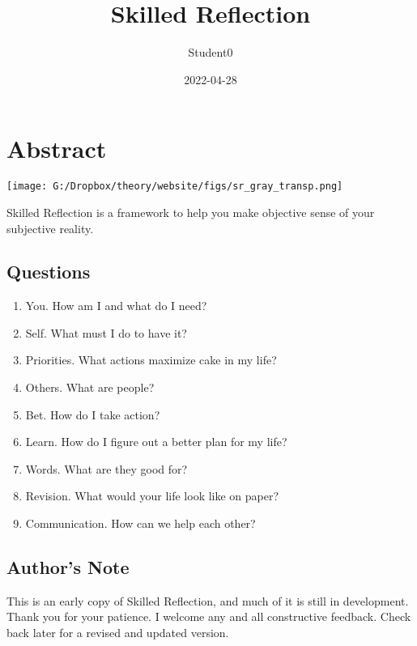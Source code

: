 \documentclass[
]{book}
\title{Skilled Reflection}
\author{Student0}
\date{2022-04-28}
\providecommand{\tightlist}{%
  \setlength{\itemsep}{0pt}\setlength{\parskip}{0pt}}
\begin{document}
\maketitle

{
\setcounter{tocdepth}{1}
\tableofcontents
}
\hypertarget{abstract}{%
\chapter*{Abstract}\label{abstract}}

\texttt{[image: G:/Dropbox/theory/website/figs/sr\_gray\_transp.png]}

Skilled Reflection is a framework to help you make objective sense of your subjective reality.

\hypertarget{questions}{%
\section{Questions}\label{questions}}

\begin{enumerate}
\def\labelenumi{\arabic{enumi}.}
\tightlist
\item
  You. How am I and what do I need?
\item
  Self. What must I do to have it?
\item
  Priorities. What actions maximize cake in my life?\\
\item
  Others. What are people?\\
\item
  Bet. How do I take action?\\
\item
  Learn. How do I figure out a better plan for my life?\\
\item
  Words. What are they good for?\\
\item
  Revision. What would your life look like on paper?
\item
  Communication. How can we help each other?
\end{enumerate}

\hypertarget{authors-note}{%
\section{Author's Note}\label{authors-note}}

This is an early copy of Skilled Reflection, and much of it is still in development. Thank you for your patience. I welcome any and all constructive feedback. Check back later for a revised and updated version.
\end{document}
